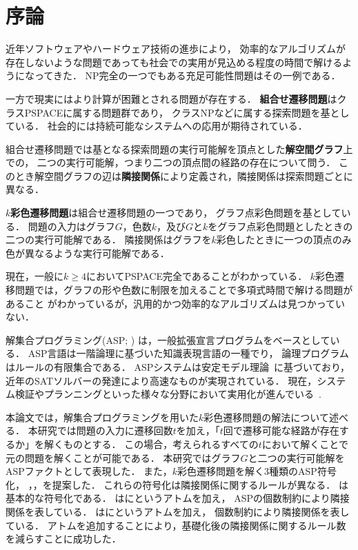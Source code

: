 \chapter{序論} \label{chap:introduction}

近年ソフトウェアやハードウェア技術の進歩により，
効率的なアルゴリズムが存在しないような問題であっても社会での実用が見込める程度の時間で解けるようになってきた．
NP完全の一つでもある充足可能性問題はその一例である．

一方で現実にはより計算が困難とされる問題が存在する．
\textbf{組合せ遷移問題}はクラスPSPACEに属する問題群であり，
クラスNPなどに属する探索問題を基としている．
社会的には持続可能なシステムへの応用が期待されている．

組合せ遷移問題では基となる探索問題の実行可能解を頂点とした\textbf{解空間グラフ}上での，
二つの実行可能解，つまり二つの頂点間の経路の存在について問う．
このとき解空間グラフの辺は\textbf{隣接関係}により定義され，隣接関係は探索問題ごとに異なる．

\textbf{$k$彩色遷移問題}は組合せ遷移問題の一つであり，
グラフ点彩色問題を基としている．
問題の入力はグラフ$G$，色数$k$，及び$G$と$k$をグラフ点彩色問題としたときの二つの実行可能解である．
隣接関係はグラフを$k$彩色したときに一つの頂点のみ色が異なるような実行可能解である．

現在，一般に$k \ge 4$においてPSPACE完全であることがわかっている．
$k$彩色遷移問題では，グラフの形や色数に制限を加えることで多項式時間で解ける問題があること
がわかっているが，汎用的かつ効率的なアルゴリズムは見つかっていない．

解集合プログラミング(ASP; \cite{%
Baral03:cambridge,%
Gelfond88:iclp,%
Niemela99:amai,%
Inoue08:jssst})
は，一般拡張宣言プログラムをベースとしている．
ASP言語は一階論理に基づいた知識表現言語の一種でり，
論理プログラムはルールの有限集合である．
ASPシステムは安定モデル理論~\cite{Gelfond88:iclp}に基づいており，
近年のSATソルバーの発達により高速なものが実現されている．
現在，システム検証やプランニングといった様々な分野において実用化が進んでいる~\cite{Erdem16:AI}.

本論文では，解集合プログラミングを用いた$k$彩色遷移問題の解法について述べる．
本研究では問題の入力に遷移回数$t$を加え，「$t$回で遷移可能な経路が存在するか」を解くものとする．
この場合，考えられるすべての$t$において解くことで元の問題を解くことが可能である．
本研究ではグラフ$G$と二つの実行可能解をASPファクトとして表現した．
また，$k$彩色遷移問題を解く3種類のASP符号化，
，，を提案した．
これらの符号化は隣接関係に関するルールが異なる．
は基本的な符号化である．
はにというアトムを加え，
ASPの個数制約により隣接関係を表している．
はにというアトムを加え，
個数制約により隣接関係を表している．
アトムを追加することにより，基礎化後の隣接関係に関するルール数を減らすことに成功した．

